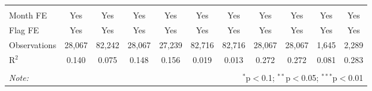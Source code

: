 \begin{table}[!htbp]
\begin{tabular}{@{\extracolsep{1pt}}lcccccccccc}
  & & & & & & & & & & \\ 
\hline \\[-1.8ex] 
Month FE & Yes & Yes & Yes & Yes & Yes & Yes & Yes & Yes & Yes & Yes \\ 
Flag FE & Yes & Yes & Yes & Yes & Yes & Yes & Yes & Yes & Yes & Yes \\ 
Observations & 28,067 & 82,242 & 28,067 & 27,239 & 82,716 & 82,716 & 28,067 & 28,067 & 1,645 & 2,289 \\ 
R$^{2}$ & 0.140 & 0.075 & 0.148 & 0.156 & 0.019 & 0.013 & 0.272 & 0.272 & 0.081 & 0.283 \\ 
\hline 
\hline \\[-1.8ex] 
\textit{Note:}  & \multicolumn{10}{r}{$^{*}$p$<$0.1; $^{**}$p$<$0.05; $^{***}$p$<$0.01} \\ 
\end{tabular} 
\end{table} 
